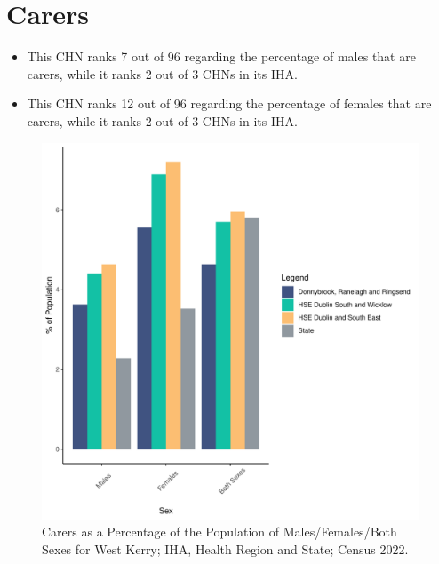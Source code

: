 \documentclass{article}
\begin{document}
\section{Carers}\label{sect:Carers}
\begin{itemize}
\item This CHN ranks  7 out of 96 regarding the percentage of males that are carers, while it ranks   2 out of 3 CHNs in its IHA.
\item This CHN ranks  12 out of 96 regarding the percentage of females that are carers, while it ranks   2 out of 3 CHNs in its IHA.
\end{itemize}
\begin{figure}[H]
	\centering
	\includegraphics[width = 150mm]{../figures/CareED.pdf}
	\caption{Carers as a Percentage of the Population of Males/Females/Both Sexes for West Kerry; IHA, Health Region and State; Census 2022.}
	\label{fig:2ae19629-1a6a-13a3-e055-000000000001}
	\end{figure}
\end{document}
